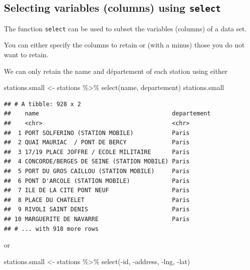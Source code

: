 \documentclass[
]{book}
\newenvironment{Shaded}{\begin{snugshade}}{\end{snugshade}}
\newcommand{\FunctionTok}[1]{\textcolor[rgb]{0.00,0.00,0.00}{#1}}
\newcommand{\NormalTok}[1]{#1}
\newcommand{\OtherTok}[1]{\textcolor[rgb]{0.56,0.35,0.01}{#1}}
\newcommand{\SpecialCharTok}[1]{\textcolor[rgb]{0.00,0.00,0.00}{#1}}
\begin{document}
\hypertarget{selecting-variables-columns-using-select}{%
\subsection{\texorpdfstring{Selecting variables (columns) using \texttt{select}}{Selecting variables (columns) using select}}\label{selecting-variables-columns-using-select}}

The function \texttt{select} can be used to subset the variables (columns) of a data set.

You can either specify the columns to retain or (with a minus) those you do not want to retain.

We can only retain the name and département of each station using either

\begin{Shaded}
\begin{Highlighting}[]
\NormalTok{stations.small }\OtherTok{\textless{}{-}}\NormalTok{ stations }\SpecialCharTok{\%\textgreater{}\%}
                     \FunctionTok{select}\NormalTok{(name, departement)}
\NormalTok{stations.small}
\end{Highlighting}
\end{Shaded}

\begin{verbatim}
## # A tibble: 928 x 2
##    name                                      departement
##    <chr>                                     <chr>      
##  1 PORT SOLFERINO (STATION MOBILE)           Paris      
##  2 QUAI MAURIAC  / PONT DE BERCY             Paris      
##  3 17/19 PLACE JOFFRE / ECOLE MILITAIRE      Paris      
##  4 CONCORDE/BERGES DE SEINE (STATION MOBILE) Paris      
##  5 PORT DU GROS CAILLOU (STATION MOBILE)     Paris      
##  6 PONT D'ARCOLE (STATION MOBILE)            Paris      
##  7 ILE DE LA CITE PONT NEUF                  Paris      
##  8 PLACE DU CHATELET                         Paris      
##  9 RIVOLI SAINT DENIS                        Paris      
## 10 MARGUERITE DE NAVARRE                     Paris      
## # ... with 918 more rows
\end{verbatim}

or

\begin{Shaded}
\begin{Highlighting}[]
\NormalTok{stations.small }\OtherTok{\textless{}{-}}\NormalTok{ stations }\SpecialCharTok{\%\textgreater{}\%} \FunctionTok{select}\NormalTok{(}\SpecialCharTok{{-}}\NormalTok{id, }\SpecialCharTok{{-}}\NormalTok{address, }\SpecialCharTok{{-}}\NormalTok{lng, }\SpecialCharTok{{-}}\NormalTok{lat)}
\end{Highlighting}
\end{Shaded}
\end{document}
